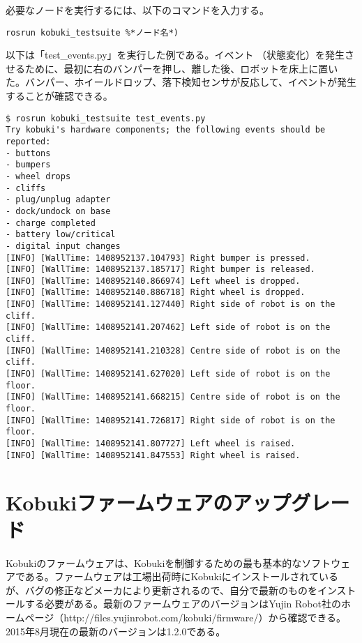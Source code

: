 必要なノードを実行するには、以下のコマンドを入力する。

\begin{lstlisting}[language=ROS]
rosrun kobuki_testsuite %*ノード名*)
\end{lstlisting}

以下は「test\_events.py」を実行した例である。イベント  （状態変化）を発生させるために、最初に右のバンパーを押し、離した後、ロボットを床上に置いた。バンパー、ホイールドロップ、落下検知センサが反応して、イベントが発生することが確認できる。

\begin{lstlisting}[language=ROS]
$ rosrun kobuki_testsuite test_events.py
Try kobuki's hardware components; the following events should be reported:
- buttons
- bumpers
- wheel drops
- cliffs
- plug/unplug adapter
- dock/undock on base
- charge completed
- battery low/critical
- digital input changes
[INFO] [WallTime: 1408952137.104793] Right bumper is pressed.
[INFO] [WallTime: 1408952137.185717] Right bumper is released.
[INFO] [WallTime: 1408952140.866974] Left wheel is dropped.
[INFO] [WallTime: 1408952140.886718] Right wheel is dropped.
[INFO] [WallTime: 1408952141.127440] Right side of robot is on the cliff.
[INFO] [WallTime: 1408952141.207462] Left side of robot is on the cliff.
[INFO] [WallTime: 1408952141.210328] Centre side of robot is on the cliff.
[INFO] [WallTime: 1408952141.627020] Left side of robot is on the floor.
[INFO] [WallTime: 1408952141.668215] Centre side of robot is on the floor.
[INFO] [WallTime: 1408952141.726817] Right side of robot is on the floor.
[INFO] [WallTime: 1408952141.807727] Left wheel is raised.
[INFO] [WallTime: 1408952141.847553] Right wheel is raised.
\end{lstlisting}

\section{Kobukiファームウェアのアップグレード}

Kobukiのファームウェアは、Kobukiを制御するための最も基本的なソフトウェアである。ファームウェアは工場出荷時にKobukiにインストールされているが、バグの修正などメーカにより更新されるので、自分で最新のものをインストールする必要がある。最新のファームウェアのバージョンはYujin Robot社のホームページ（http://files.yujinrobot.com/kobuki/firmware/）から確認できる。2015年8月現在の最新のバージョンは1.2.0である。

